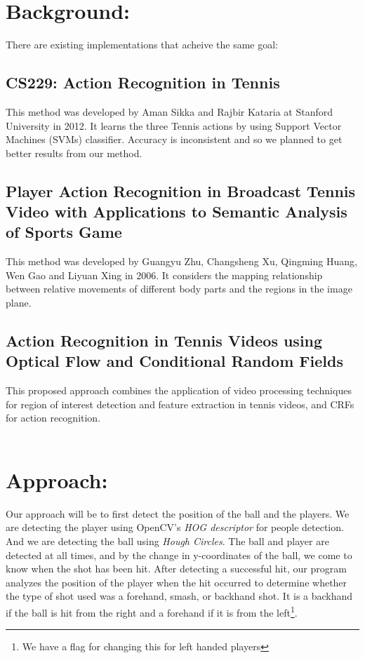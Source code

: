 \documentclass[10.5pt]{proc}
\begin{document}
    \section{Background:}
    There are existing implementations that acheive the same goal:
    \subsection{CS229: Action Recognition in Tennis\cite{stanford2012}}
        This method was developed by Aman Sikka and Rajbir Kataria at Stanford University in 2012. It learns the three Tennis actions by using Support Vector Machines (SVMs) classifier. Accuracy is inconsistent and so we planned to get better results from our method.
    \subsection{Player Action Recognition in Broadcast Tennis Video with Applications to Semantic Analysis of Sports Game\cite{asians}}
    This method was developed by Guangyu Zhu, Changsheng Xu, Qingming Huang, Wen Gao and Liyuan Xing in 2006. It considers the mapping relationship between relative movements of different body parts and the regions in the image plane.
    \subsection{Action Recognition in Tennis Videos using Optical Flow and Conditional Random Fields\cite{argentina}}
    This proposed approach combines the application of video processing techniques for region of interest detection and feature extraction in tennis videos, and CRFs for action recognition.\\
    \\

    \section{Approach:}
    Our approach will be to first detect the position of the ball and the players. We are detecting the player using OpenCV's \textit{HOG descriptor}\cite{hog} for people detection. And we are detecting the ball using \textit{Hough Circles}. The ball and player are detected at all times, and by the change in y-coordinates of the ball, we come to know when the shot has been hit. After detecting a successful hit, our program  analyzes the position of the player when the hit occurred to determine whether the type of shot used was a forehand, smash, or backhand shot. It is a backhand if the ball is hit from the right and a forehand if it is from the left\footnote{We have a flag for changing this for left handed players}.
    
\end{document}
